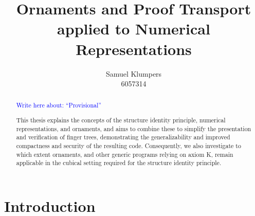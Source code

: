 \documentclass{article}
\title{Ornaments and Proof Transport applied to Numerical Representations}
\author{Samuel Klumpers\\6057314}
\theoremstyle{plain}%
\theoremstyle{definition}
\newcommand{\towrite}[1]{\par\textcolor{blue}{Write here about: ``#1''}\par}
\begin{document}
\maketitle


\begin{abstract}
\towrite{Provisional}
This thesis explains the concepts of the structure identity principle, numerical representations, and ornaments, and aims to combine these to simplify the presentation and verification of finger trees, demonstrating the generalizability and improved compactness and security of the resulting code. Consequently, we also investigate to which extent ornaments, and other generic programs relying on axiom K, remain applicable in the cubical setting required for the structure identity principle.
\end{abstract}

\tableofcontents

\begin{comment}
\section*{Outline}
In this document I propose a master thesis project, in which I will investigate and attempt to counter the obstacles one can encounter when replacing one datastructure with a more complicated one, focussing on how we can retain or reuse properties and proofs from the simpler datastructure.

We introduce the topics of proof transport, ornamentation, and numerical representation by presenting problems and explaining how these topics can be applied to them. Following up on these problems, we make our research question more precise, list some related questions, and propose methods by which we may answer these questions. We then overview related research and existing theory, highlighting the problems they originally solved, and how we may apply them to our research question. Next, we summarize preliminary work done for this project. Finally, we propose a planning, explaining more precisely how we split the research question into parts and what subproblems we intend to solve working towards answering our research question.
\end{comment}


\section{Introduction}\label{sec:intro}

\end{document}
